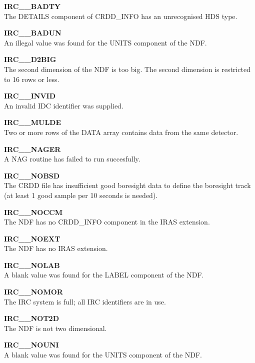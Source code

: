 \begin{description}
\item {\bf IRC\_\_BADTY     }\\
The DETAILS component of CRDD\_INFO has an unrecognised HDS type.

\item {\bf IRC\_\_BADUN     }\\
An illegal value was found for the UNITS component of the NDF.

\item {\bf IRC\_\_D2BIG     }\\
The second dimension of the NDF is too big. The second dimension is restricted 
to 16 rows or less.

\item {\bf IRC\_\_INVID     }\\
An invalid IDC identifier was supplied.

\item {\bf IRC\_\_MULDE     }\\
Two or more rows of the DATA array contains data from the same detector.

\item {\bf IRC\_\_NAGER     }\\
A NAG routine has failed to run succesfully.

\item {\bf IRC\_\_NOBSD     }\\
The CRDD file has insufficient good boresight data to define the boresight
track (at least 1 good sample per 10 seconds is needed).

\item {\bf IRC\_\_NOCCM     }\\
The NDF has no CRDD\_INFO component in the IRAS extension.

\item {\bf IRC\_\_NOEXT     }\\
The NDF has no IRAS extension.

\item {\bf IRC\_\_NOLAB     }\\
A blank value was found for the LABEL component of the NDF.

\item {\bf IRC\_\_NOMOR     }\\
The IRC system is full; all IRC identifiers are in use.

\item {\bf IRC\_\_NOT2D     }\\
The NDF is not two dimensional.

\item {\bf IRC\_\_NOUNI     }\\
A blank value was found for the UNITS component of the NDF.


\end{description}
